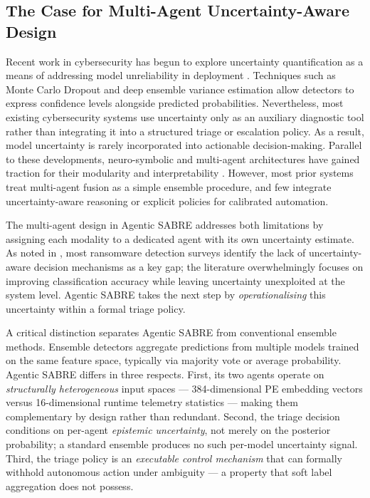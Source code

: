 \subsection{The Case for Multi-Agent Uncertainty-Aware Design}

Recent work in cybersecurity has begun to explore uncertainty quantification as a means of addressing model unreliability in deployment \cite{gal2016dropout, gawlikowski2023Uncertainity, kabuye2025explainable}. Techniques such as Monte Carlo Dropout and deep ensemble variance estimation allow detectors to express confidence levels alongside predicted probabilities. Nevertheless, most existing cybersecurity systems use uncertainty only as an auxiliary diagnostic tool rather than integrating it into a structured triage or escalation policy. As a result, model uncertainty is rarely incorporated into actionable decision-making. Parallel to these developments, neuro-symbolic and multi-agent architectures have gained traction for their modularity and interpretability \cite{Besold2021neurosymbolicsurvey}. However, most prior systems treat multi-agent fusion as a simple ensemble procedure, and few integrate uncertainty-aware reasoning or explicit policies for calibrated automation.

The multi-agent design in Agentic SABRE addresses both limitations by assigning each modality to a dedicated agent with its own uncertainty estimate. As noted in \cite{Ispahany2024Survey}, most ransomware detection surveys identify the lack of uncertainty-aware decision mechanisms as a key gap; the literature overwhelmingly focuses on improving classification accuracy while leaving uncertainty unexploited at the system level. Agentic SABRE takes the next step by \emph{operationalising} this uncertainty within a formal triage policy.

A critical distinction separates Agentic SABRE from conventional ensemble methods. Ensemble detectors aggregate predictions from multiple models trained on the same feature space, typically via majority vote or average probability. Agentic SABRE differs in three respects. First, its two agents operate on \emph{structurally heterogeneous} input spaces — 384-dimensional PE embedding vectors versus 16-dimensional runtime telemetry statistics — making them complementary by design rather than redundant. Second, the triage decision conditions on per-agent \emph{epistemic uncertainty}, not merely on the posterior probability; a standard ensemble produces no such per-model uncertainty signal. Third, the triage policy is an \emph{executable control mechanism} that can formally withhold autonomous action under ambiguity — a property that soft label aggregation does not possess.


